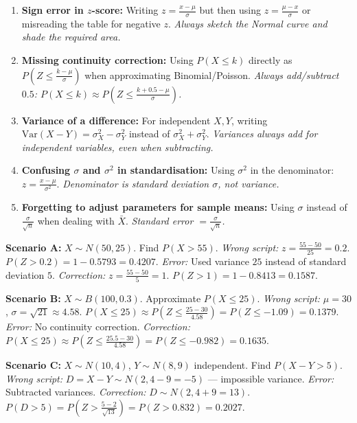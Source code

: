 \documentclass[11pt]{article}
\begin{document}
\begin{attention}
\begin{enumerate}
\item \textbf{Sign error in $z$-score:} Writing $z=\frac{x-\mu}{\sigma}$ but then using $z=\frac{\mu-x}{\sigma}$ or misreading the table for negative $z$. \emph{Always sketch the Normal curve and shade the required area.}
\item \textbf{Missing continuity correction:} Using $P(X\le k)$ directly as $P(Z\le \frac{k-\mu}{\sigma})$ when approximating Binomial/Poisson. \emph{Always add/subtract $0.5$: $P(X\le k)\approx P(Z\le \frac{k+0.5-\mu}{\sigma})$.}
\item \textbf{Variance of a difference:} For independent $X,Y$, writing $\mathrm{Var}(X-Y)=\sigma_X^2-\sigma_Y^2$ instead of $\sigma_X^2+\sigma_Y^2$. \emph{Variances always add for independent variables, even when subtracting.}
\item \textbf{Confusing $\sigma$ and $\sigma^2$ in standardisation:} Using $\sigma^2$ in the denominator: $z=\frac{x-\mu}{\sigma^2}$. \emph{Denominator is standard deviation $\sigma$, not variance.}
\item \textbf{Forgetting to adjust parameters for sample means:} Using $\sigma$ instead of $\frac{\sigma}{\sqrt{n}}$ when dealing with $\bar{X}$. \emph{Standard error $=\frac{\sigma}{\sqrt{n}}$.}
\end{enumerate}
\end{attention}

\begin{experience}
\textbf{Scenario A:} $X\sim N(50, 25)$. Find $P(X>55)$.
\emph{Wrong script:} $z=\frac{55-50}{25}=0.2$. $P(Z>0.2)=1-0.5793=0.4207$.
\emph{Error:} Used variance $25$ instead of standard deviation $5$.
\emph{Correction:} $z=\frac{55-50}{5}=1$. $P(Z>1)=1-0.8413=0.1587$.

\textbf{Scenario B:} $X\sim B(100, 0.3)$. Approximate $P(X\le 25)$.
\emph{Wrong script:} $\mu=30$, $\sigma=\sqrt{21}\approx 4.58$. $P(X\le 25)\approx P\left(Z\le\frac{25-30}{4.58}\right)=P(Z\le -1.09)=0.1379$.
\emph{Error:} No continuity correction.
\emph{Correction:} $P(X\le 25)\approx P\left(Z\le\frac{25.5-30}{4.58}\right)=P(Z\le -0.982)=0.1635$.

\textbf{Scenario C:} $X\sim N(10,4)$, $Y\sim N(8,9)$ independent. Find $P(X-Y>5)$.
\emph{Wrong script:} $D=X-Y\sim N(2, 4-9=-5)$ — impossible variance.
\emph{Error:} Subtracted variances.
\emph{Correction:} $D\sim N(2, 4+9=13)$. $P(D>5)=P\left(Z>\frac{5-2}{\sqrt{13}}\right)=P(Z>0.832)=0.2027$.
\end{experience}
\end{document}
